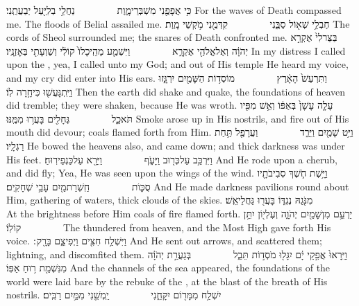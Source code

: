 {כִּ֥י אֲפָפֻ֖נִי מִשְׁבְּרֵי\maqqaf מָ֑וֶת         נַחֲלֵ֥י בְלִיַּ֖עַל יְבַעֲתֻֽנִי׃}
{For the waves of Death compassed me. The floods of Belial assailed me.}
{חֶבְלֵ֥י שְׁא֖וֹל סַבֻּ֑נִי         קִדְּמֻ֖נִי מֹ֥קְשֵׁי מָֽוֶת׃}
{The cords of Sheol surrounded me; the snares of Death confronted me.}
{בַּצַּר\maqqaf לִי֙ אֶקְרָ֣א יְהֹוָ֔ה וְאֶל\maqqaf אֱלֹהַ֖י אֶקְרָ֑א         וַיִּשְׁמַ֤ע מֵהֵֽיכָלוֹ֙ קוֹלִ֔י וְשַׁוְעָתִ֖י בְּאׇזְנָֽיו׃}
{In my distress I called upon the \lord, yea, I called unto my God; and out of His temple He heard my voice, and my cry did enter into His ears.}
{ וַתִּרְעַשׁ֙ הָאָ֔רֶץ         מוֹסְד֥וֹת הַשָּׁמַ֖יִם יִרְגָּ֑זוּ וַיִּֽתְגָּעֲשׁ֖וּ כִּי\maqqaf חָ֥רָה לֽוֹ׃}
{Then the earth did shake and quake, the foundations of heaven did tremble; they were shaken, because He was wroth.}
{עָלָ֤ה עָשָׁן֙ בְּאַפּ֔וֹ וְאֵ֥שׁ מִפִּ֖יו תֹּאכֵ֑ל         גֶּחָלִ֖ים בָּעֲר֥וּ מִמֶּֽנּוּ׃}
{Smoke arose up in His nostrils, and fire out of His mouth did devour; coals flamed forth from Him.}
{וַיֵּ֥ט שָׁמַ֖יִם וַיֵּרַ֑ד         וַעֲרָפֶ֖ל תַּ֥חַת רַגְלָֽיו׃}
{He bowed the heavens also, and came down; and thick darkness was under His feet.}
{וַיִּרְכַּ֥ב עַל\maqqaf כְּר֖וּב וַיָּעֹ֑ף         וַיֵּרָ֖א עַל\maqqaf כַּנְפֵי\maqqaf רֽוּחַ׃}
{And He rode upon a cherub, and did fly; Yea, He was seen upon the wings of the wind.}
{וַיָּ֥שֶׁת חֹ֛שֶׁךְ סְבִיבֹתָ֖יו סֻכּ֑וֹת         חַֽשְׁרַת\maqqaf מַ֖יִם עָבֵ֥י שְׁחָקִֽים׃}
{And He made darkness pavilions round about Him, gathering of waters, thick clouds of the skies.}
{מִנֹּ֖גַהּ נֶגְדּ֑וֹ בָּעֲר֖וּ גַּחֲלֵי\maqqaf אֵֽשׁ׃        }
{At the brightness before Him coals of fire flamed forth.}
{יַרְעֵ֥ם מִן\maqqaf שָׁמַ֖יִם יְהֹוָ֑ה וְעֶלְי֖וֹן יִתֵּ֥ן קוֹלֽוֹ׃        }
{The \lord\space thundered from heaven, and the Most High gave forth His voice.}
{וַיִּשְׁלַ֥ח חִצִּ֖ים וַיְפִיצֵ֑ם בָּרָ֖ק ׃}
{And He sent out arrows, and scattered them; lightning, and discomfited them.}
{וַיֵּֽרָאוּ֙ אֲפִ֣קֵי יָ֔ם יִגָּל֖וּ מֹסְד֣וֹת תֵּבֵ֑ל         בְּגַעֲרַ֣ת יְהֹוָ֔ה מִנִּשְׁמַ֖ת ר֥וּחַ אַפּֽוֹ׃}
{And the channels of the sea appeared, the foundations of the world were laid bare by the rebuke of the \lord, at the blast of the breath of His nostrils.}
{יִשְׁלַ֥ח מִמָּר֖וֹם יִקָּחֵ֑נִי         יַֽמְשֵׁ֖נִי מִמַּ֥יִם רַבִּֽים׃}
